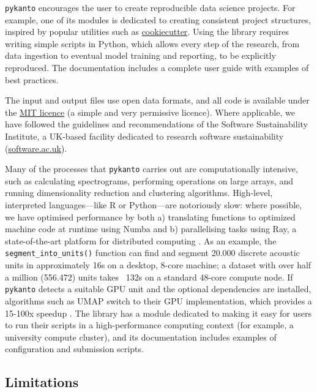 \texttt{pykanto} encourages the user to create reproducible data science
projects. For example, one of its modules is dedicated to creating consistent
project structures, inspired by popular utilities such as
\href{https://github.com/cookiecutter/cookiecutter}{cookiecutter}. Using the
library requires writing simple scripts in Python, which allows every step of
the research, from data ingestion to eventual model training and reporting, to be
explicitly reproduced. The documentation includes a complete user guide with
examples of best practices.

The input and output files use open data formats, and all code is available
under the \href{https://choosealicense.com/licenses/mit/}{MIT licence} (a simple
and very permissive licence). Where applicable, we have followed the guidelines
and recommendations of the Software Sustainability Institute, a UK-based
facility dedicated to research software sustainability
(\href{https://www.software.ac.uk/}{software.ac.uk}).



Many of the processes that \texttt{pykanto} carries out are computationally
intensive, such as calculating spectrograms, performing operations on large
arrays, and running dimensionality reduction and clustering algorithms.
High-level, interpreted languages---like R or Python---are notoriously slow: where
possible, we have optimised performance by both a) translating functions to
optimized machine code at runtime using Numba \parencite{lam2015} and b)
parallelising tasks using Ray, a state-of-the-art platform for distributed
computing \parencite{moritz2018}. As an example, the \texttt{segment\_into\_units()}
function can find and segment 20.000 discrete acoustic units in approximately
16s on a desktop, 8-core machine; a dataset with over half a million (556.472)
units takes ~132s on a standard 48-core compute node. If \texttt{pykanto} detects a
suitable GPU unit and the optional dependencies are installed, algorithms such
as UMAP \parencite{mcinnes2018} switch to their GPU implementation, which provides a
15-100x speedup \parencite{nolet2021, raschka2020}. The library has a module
dedicated to making it easy for users to run their scripts in a high-performance
computing context (for example, a university compute cluster), and its
documentation includes examples of configuration and submission scripts.

\subsection{Limitations}

